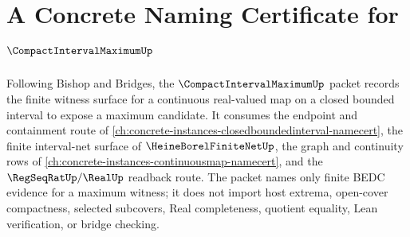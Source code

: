 \chapter{A Concrete Naming Certificate for $\CompactIntervalMaximumUp$}
\label{ch:concrete-instances-compact-interval-maximum-namecert}

Following Bishop and Bridges, the $\CompactIntervalMaximumUp$ packet records the finite witness surface for a continuous real-valued map on a closed bounded interval to expose a maximum candidate. It consumes the endpoint and containment route of \autoref{ch:concrete-instances-closedboundedinterval-namecert}, the finite interval-net surface of $\HeineBorelFiniteNetUp$, the graph and continuity rows of \autoref{ch:concrete-instances-continuousmap-namecert}, and the $\RegSeqRatUp/\RealUp$ readback route. The packet names only finite BEDC evidence for a maximum witness; it does not import host extrema, open-cover compactness, selected subcovers, Real completeness, quotient equality, Lean verification, or bridge checking.

